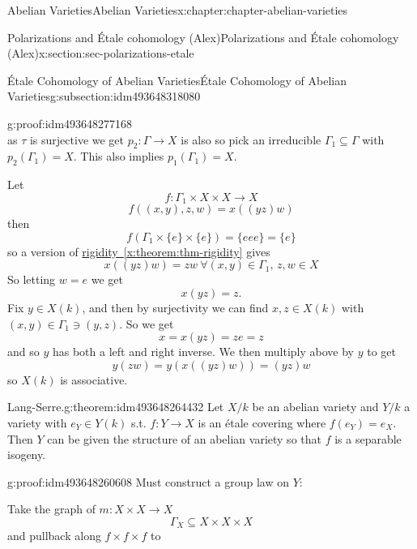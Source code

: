 \documentclass[oneside,10pt,]{book}
\numberwithin{equation}{section}
\begin{document}
\begin{chapterptx}{Abelian Varieties}{}{Abelian Varieties}{}{}{x:chapter:chapter-abelian-varieties}
\begin{sectionptx}{Polarizations and Étale cohomology (Alex)}{}{Polarizations and Étale cohomology (Alex)}{}{}{x:section:sec-polarizations-etale}
\begin{subsectionptx}{Étale Cohomology of Abelian Varieties}{}{Étale Cohomology of Abelian Varieties}{}{}{g:subsection:idm493648318080}
\begin{proofptx}{}{g:proof:idm493648277168}
\begin{equation*}
\end{equation*}
as \(\tau \) is surjective we get \(p_2 \colon \Gamma \to X\) is also so pick an irreducible \(\Gamma_1 \subseteq \Gamma\) with \(p_2(\Gamma_1) = X\). This also implies \(p_1(\Gamma_1) = X\).%
\par
Let%
\begin{equation*}
f\colon \Gamma_1 \times X\times X \to X
\end{equation*}
%
\begin{equation*}
f((x,y),z,w) = x((yz)w)
\end{equation*}
then%
\begin{equation*}
f(\Gamma_1 \times\{e\}\times\{e\}) = \{eee\} = \{e\}
\end{equation*}
so a version of \hyperref[x:theorem:thm-rigidity]{rigidity~\ref{x:theorem:thm-rigidity}} gives%
\begin{equation*}
x((yz)w) = zw\ \forall (x,y) \in \Gamma_1,\,z,w\in X
\end{equation*}
So letting \(w = e\) we get%
\begin{equation*}
x(yz) = z\text{.}
\end{equation*}
Fix \(y \in X(k)\), and then by surjectivity we can find \(x,z \in X(k)\) with \((x,y)\in \Gamma_1 \ni (y,z)\). So we get%
\begin{equation*}
x = x(yz) = ze = z
\end{equation*}
and so \(y\) has both a left and right inverse. We then multiply above by \(y\) to get%
\begin{equation*}
y(zw) = y(x((yz)w)) = (yz)w
\end{equation*}
so \(X(k)\) is associative.%
\end{proofptx}
\begin{theorem}{Lang-Serre.}{}{g:theorem:idm493648264432}%
Let \(X/k\) be an abelian variety and \(Y/k\) a variety with \(e_Y\in Y(k)\) s.t. \(f\colon Y \to X\) is an étale covering where \(f(e_Y) = e_X\). Then \(Y\) can be given the structure of an abelian variety so that \(f\) is a separable isogeny.%
\end{theorem}
\begin{proofptx}{}{g:proof:idm493648260608}
Must construct a group law on \(Y\):%
\par
Take the graph of \(m\colon X\times X \to X\)%
\begin{equation*}
\Gamma_X \subseteq X\times X\times X
\end{equation*}
and pullback along \(f\times f\times f\) to%
\begin{equation*}

\end{equation*}
\end{proofptx}
\end{subsectionptx}
\end{sectionptx}
\end{chapterptx}
\end{document}
